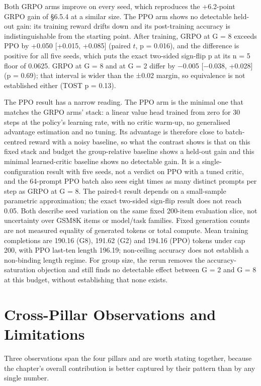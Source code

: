 \documentclass[12pt,a4paper]{report}
\begin{document}
Both GRPO arms improve on every seed, which reproduces the +6.2-point
GRPO gain of §6.5.4 at a similar size. The PPO arm shows no detectable
held-out gain: its training reward drifts down and its post-training
accuracy is indistinguishable from the starting point. After training,
GRPO at G = 8 exceeds PPO by +0.050 {[}+0.015, +0.085{]} (paired \(t\),
p = 0.016), and the difference is positive for all five seeds, which
puts the exact two-sided sign-flip p at its n = 5 floor of 0.0625. GRPO
at G = 8 and at G = 2 differ by −0.005 {[}−0.038, +0.028{]} (p = 0.69);
that interval is wider than the ±0.02 margin, so equivalence is not
established either (TOST p = 0.13).

The PPO result has a narrow reading. The PPO arm is the minimal one that
matches the GRPO arms' stack: a linear value head trained from zero for
30 steps at the policy's learning rate, with no critic warm-up, no
generalised advantage estimation and no tuning. Its advantage is
therefore close to batch-centred reward with a noisy baseline, so what
the contrast shows is that on this fixed stack and budget the
group-relative baseline shows a held-out gain and this minimal
learned-critic baseline shows no detectable gain. It is a
single-configuration result with five seeds, not a verdict on PPO with a
tuned critic, and the 64-prompt PPO batch also sees eight times as many
distinct prompts per step as GRPO at G = 8. The paired-t result depends
on a small-sample parametric approximation; the exact two-sided
sign-flip result does not reach 0.05. Both describe seed variation on
the same fixed 200-item evaluation slice, not uncertainty over GSM8K
items or model/task families. Fixed generation counts are not measured
equality of generated tokens or total compute. Mean training completions
are 190.16 (G8), 191.62 (G2) and 194.16 (PPO) tokens under cap 200, with
PPO last-ten length 196.19; non-ceiling accuracy does not establish a
non-binding length regime. For group size, the rerun removes the
accuracy-saturation objection and still finds no detectable effect
between G = 2 and G = 8 at this budget, without establishing that none
exists.

\section{Cross-Pillar Observations and
Limitations}\label{cross-pillar-observations-and-limitations}

Three observations span the four pillars and are worth stating together,
because the chapter's overall contribution is better captured by their
pattern than by any single number.
\end{document}
